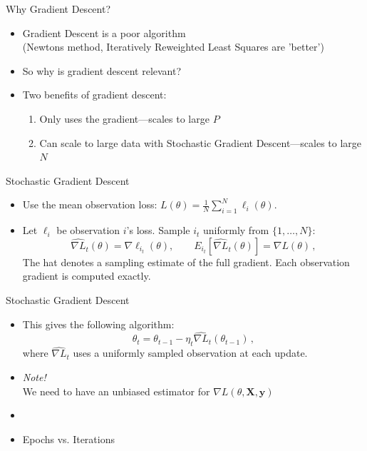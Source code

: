 \documentclass[10pt]{beamer}
\begin{document}
\begin{frame}{Why Gradient Descent?}


\begin{itemize}
\item Gradient Descent is a poor algorithm \\ (Newtons method, Iteratively Reweighted Least Squares are 'better')
\item So why is gradient descent relevant?\pause
\item Two benefits of gradient descent:
\begin{enumerate}
\item Only uses the gradient---scales to large $P$
\item Can scale to large data with Stochastic Gradient Descent---scales to large $N$
\end{enumerate}
\end{itemize}

\end{frame}


\begin{frame}{Stochastic Gradient Descent}


\begin{itemize}
\item Use the mean observation loss: $L(\theta)=\frac{1}{N}\sum_{i=1}^N\ell_i(\theta)$.
\pause
\item Let $\ell_i$ be observation $i$'s loss. Sample $i_t$ uniformly from $\{1,\ldots,N\}$:
\[
\widehat{\nabla L}_t(\theta)=\nabla\ell_{i_t}(\theta),\qquad E_{i_t}[\widehat{\nabla L}_t(\theta)]=\nabla L(\theta)\,,
\]
The hat denotes a sampling estimate of the full gradient. Each observation gradient is computed exactly.
\end{itemize}


\end{frame}


\begin{frame}{Stochastic Gradient Descent}


\begin{itemize}
\item This gives the following algorithm:
\[
\theta_t = \theta_{t-1} - \eta_t \widehat{\nabla L}_t(\theta_{t-1})\,,
\]
where $\widehat{\nabla L}_t$ uses a uniformly sampled observation at each update.
\item \emph{Note!} \\We need to have an unbiased estimator for $\nabla L(\theta, \mathbf{X}, \mathbf{y})$
\pause
\item {}\pause
\item Epochs vs. Iterations
\end{itemize}


\end{frame}
\end{document}

